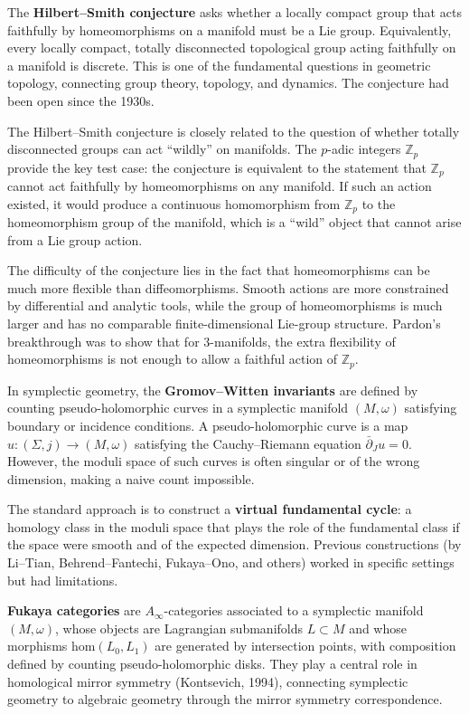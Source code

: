 The \textbf{Hilbert--Smith conjecture} asks whether a locally compact group that acts faithfully by homeomorphisms on a manifold must be a Lie group. Equivalently, every locally compact, totally disconnected topological group acting faithfully on a manifold is discrete. This is one of the fundamental questions in geometric topology, connecting group theory, topology, and dynamics. The conjecture had been open since the 1930s.

The Hilbert--Smith conjecture is closely related to the question of whether totally disconnected groups can act ``wildly'' on manifolds. The $p$-adic integers $\mathbb{Z}_p$ provide the key test case: the conjecture is equivalent to the statement that $\mathbb{Z}_p$ cannot act faithfully by homeomorphisms on any manifold. If such an action existed, it would produce a continuous homomorphism from $\mathbb{Z}_p$ to the homeomorphism group of the manifold, which is a ``wild'' object that cannot arise from a Lie group action.

The difficulty of the conjecture lies in the fact that homeomorphisms can be much more flexible than diffeomorphisms. Smooth actions are more constrained by differential and analytic tools, while the group of homeomorphisms is much larger and has no comparable finite-dimensional Lie-group structure. Pardon's breakthrough was to show that for 3-manifolds, the extra flexibility of homeomorphisms is not enough to allow a faithful action of $\mathbb{Z}_p$.

In symplectic geometry, the \textbf{Gromov--Witten invariants} are defined by counting pseudo-holomorphic curves in a symplectic manifold $(M,\omega)$ satisfying boundary or incidence conditions. A pseudo-holomorphic curve is a map $u:(\Sigma,j)\to(M,\omega)$ satisfying the Cauchy--Riemann equation $\bar{\partial}_J u = 0$. However, the moduli space of such curves is often singular or of the wrong dimension, making a naive count impossible.

The standard approach is to construct a \textbf{virtual fundamental cycle}: a homology class in the moduli space that plays the role of the fundamental class if the space were smooth and of the expected dimension. Previous constructions (by Li--Tian, Behrend--Fantechi, Fukaya--Ono, and others) worked in specific settings but had limitations.

\textbf{Fukaya categories} are $A_\infty$-categories associated to a symplectic manifold $(M,\omega)$, whose objects are Lagrangian submanifolds $L \subset M$ and whose morphisms $\mathrm{hom}(L_0,L_1)$ are generated by intersection points, with composition defined by counting pseudo-holomorphic disks. They play a central role in homological mirror symmetry (Kontsevich, 1994), connecting symplectic geometry to algebraic geometry through the mirror symmetry correspondence.

